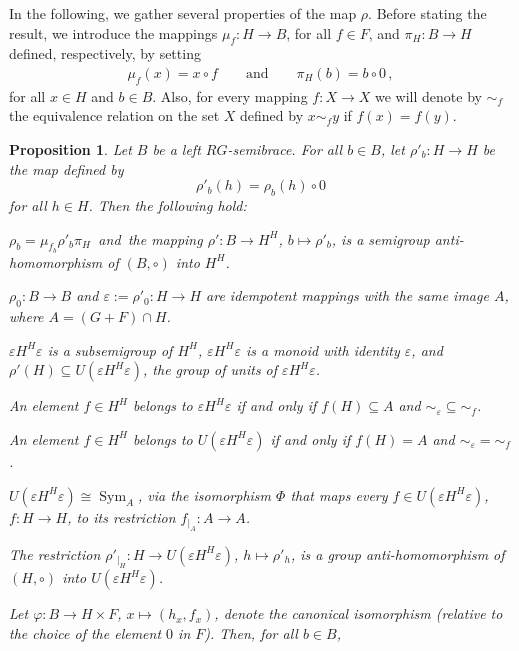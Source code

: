 \documentclass[11pt]{amsart}
\newcommand{\Sym}{\operatorname{Sym}}
\newtheorem{proposition}[theorem]{Proposition}
\theoremstyle{definition}
\begin{document}
In the following, we gather several properties of the map $\rho$. Before stating the result, we introduce the mappings $\mu_f:H \to B$, for all $f \in F$, and $\pi_H:B \to H$ defined, respectively, by setting 
\begin{align*}
    \mu_f(x) = x \circ f \qquad\text{and}\qquad \pi_H(b) = b \circ 0 \,,
\end{align*}
for all $x \in H$ and $b \in B$. Also, for every mapping $f\colon X\to X$ we will denote by $\sim_f$ the equivalence relation on the set $X$ defined by $x\sim_f y$ if $f(x)=f(y)$.

\begin{proposition}\label{daria}
    Let $B$ be a left $RG$-semibrace. For all  $b\in B$, let $\rho'_b\colon H\to H$ be the map defined by
         $$\rho'_b(h)=\rho_b(h) \circ 0$$
         for all $h \in H$.
         Then the following hold: 
    \begin{itemize}
         \item[\rm (a)]
         $\rho_b = \mu_{f_b}\rho'_b\pi_H$\, and\,
         the mapping $\rho'\colon B\to H^H$, $b\mapsto \rho'_b$, is a semigroup anti-homomorphism of $(B,\circ)$ into $H^H$.
  \item[\rm (b)] { $\rho_0\colon B\to B$ and $\varepsilon:=\rho'_0\colon H\to H$ are idempotent mappings with the same image $A$, where $A=(G+F)\cap H$.
   \item[\rm (c)] $\varepsilon H^H\varepsilon$ is a subsemigroup of $H^H$, $\varepsilon H^H\varepsilon$ is a monoid with identity $\varepsilon$, and $\rho'(H)\subseteq U\left(\varepsilon H^H\varepsilon\right)$, the group of units of $\varepsilon H^H\varepsilon$.
  \item[\rm (d)] 
  An element $f\in H^H$ belongs to $\varepsilon H^H\varepsilon$ if and only if $f(H)\subseteq A$ and $\sim_\varepsilon\subseteq\sim_f$.
   \item[\rm (e)] 
   An element $f\in H^H$ belongs to $U\left(\varepsilon H^H\varepsilon\right)$ if and only if $f(H)= A$ and $\sim_\varepsilon=\sim_f$.
   \item[\rm (f)] $U(\varepsilon H^H\varepsilon)\cong\Sym_A$, via the isomorphism $\Phi$ that maps every $f\in U(\varepsilon H^H\varepsilon)$, $f\colon H\to H$, to its restriction 
   $f_{|_A}\colon A\to A$.
    \item[\rm (g)] The restriction $\rho'_{|_H}\colon H\to U\left(\varepsilon H^H\varepsilon\right)$, $h\mapsto \rho'_h$, is a group anti-homomorphism of $(H,\circ)$ into $U\left(\varepsilon H^H\varepsilon\right)$.
  \item[\rm (h)] Let $\varphi\colon B\to H\times F$, $x \mapsto(h_x,f_x)$, denote the canonical isomorphism (relative to the choice of the element $0$ in $F$). Then, for all  $b\in B$, 
}
\end{itemize}
\end{proposition}
\end{document}
